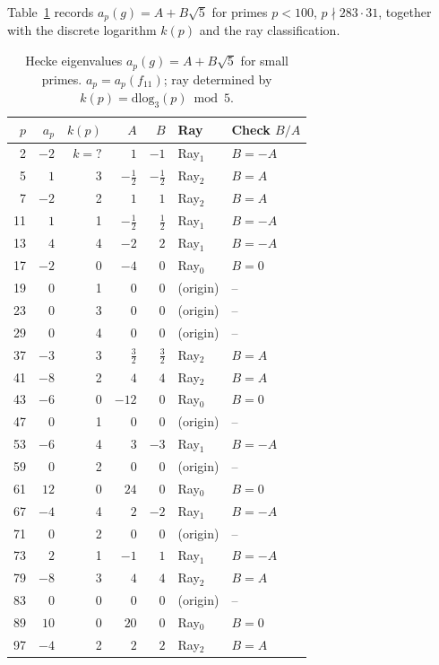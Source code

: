 Table~\ref{tab:eigenvalues} records $a_p(g) = A + B\sqrt{5}$ for primes
$p < 100$, $p \nmid 283 \cdot 31$, together with the discrete logarithm
$k(p)$ and the ray classification.

\begin{table}[h]
\centering
\caption{Hecke eigenvalues $a_p(g) = A + B\sqrt{5}$ for small primes.
$a_p = a_p(f_{11})$; ray determined by $k(p) = \mathrm{dlog}_3(p) \bmod 5$.}
\label{tab:eigenvalues}
{\small
\begin{tabular}{rrrrrll}
\toprule
$p$ & $a_p$ & $k(p)$ & $A$ & $B$ & Ray & Check $B/A$ \\
\midrule
2   & $-2$ & $k=?$ & $1$ & $-1$ & Ray$_1$ & $B=-A$ \\
5   & $1$  & 3 & $-\frac{1}{2}$ & $-\frac{1}{2}$ & Ray$_2$ & $B=A$ \\
7   & $-2$ & 2 & $1$ & $1$ & Ray$_2$ & $B=A$ \\
11  & $1$  & 1 & $-\frac{1}{2}$ & $\frac{1}{2}$ & Ray$_1$ & $B=-A$ \\
13  & $4$  & 4 & $-2$ & $2$ & Ray$_1$ & $B=-A$ \\
17  & $-2$ & 0 & $-4$ & $0$ & Ray$_0$ & $B=0$ \\
19  & $0$  & 1 & $0$ & $0$ & (origin) & -- \\
23  & $0$  & 3 & $0$ & $0$ & (origin) & -- \\
29  & $0$  & 4 & $0$ & $0$ & (origin) & -- \\
37  & $-3$ & 3 & $\frac{3}{2}$ & $\frac{3}{2}$ & Ray$_2$ & $B=A$ \\
41  & $-8$ & 2 & $4$ & $4$ & Ray$_2$ & $B=A$ \\
43  & $-6$ & 0 & $-12$ & $0$ & Ray$_0$ & $B=0$ \\
47  & $0$  & 1 & $0$ & $0$ & (origin) & -- \\
53  & $-6$ & 4 & $3$ & $-3$ & Ray$_1$ & $B=-A$ \\
59  & $0$  & 2 & $0$ & $0$ & (origin) & -- \\
61  & $12$ & 0 & $24$ & $0$ & Ray$_0$ & $B=0$ \\
67  & $-4$ & 4 & $2$ & $-2$ & Ray$_1$ & $B=-A$ \\
71  & $0$  & 2 & $0$ & $0$ & (origin) & -- \\
73  & $2$  & 1 & $-1$ & $1$ & Ray$_1$ & $B=-A$ \\
79  & $-8$ & 3 & $4$ & $4$ & Ray$_2$ & $B=A$ \\
83  & $0$  & 0 & $0$ & $0$ & (origin) & -- \\
89  & $10$ & 0 & $20$ & $0$ & Ray$_0$ & $B=0$ \\
97  & $-4$ & 2 & $2$ & $2$ & Ray$_2$ & $B=A$ \\
\bottomrule
\end{tabular}
}
\end{table}

